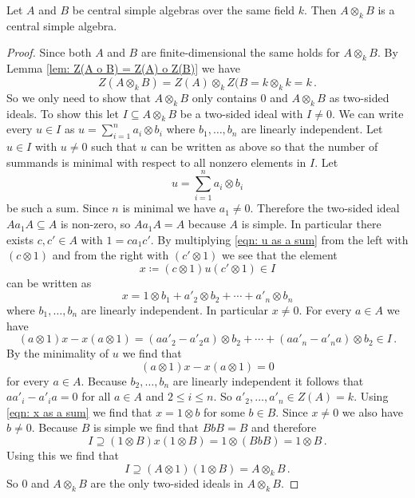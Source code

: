 \begin{prop}
  Let $A$ and $B$ be central simple algebras over the same field $k$.
  Then $A \otimes_k B$ is a central simple algebra.
\end{prop}
\begin{proof}
  Since both $A$ and $B$ are finite-dimensional the same holds for $A \otimes_k B$.
  By Lemma \ref{lem: Z(A o B) = Z(A) o Z(B)} we have
  \[
      Z(A \otimes_k B)
    = Z(A) \otimes_k Z(B
    = k \otimes_k k
    = k \,.
  \]
  So we only need to show that $A \otimes_k B$ only contains $0$ and $A \otimes_k B$ as two-sided ideals.
  To show this let $I \subseteq A \otimes_k B$ be a two-sided ideal with $I \neq 0$.
  We can write every $u \in I$ as $u = \sum_{i=1}^n a_i \otimes b_i$ where $b_1, \dotsc, b_n$ are linearly independent.
  Let $u \in I$ with $u \neq 0$ such that $u$ can be written as above so that the number of summands is minimal with respect to all nonzero elements in $I$.
  Let
  \begin{equation}\label{eqn: u as a sum}
    u = \sum_{i=1}^n a_i \otimes b_i
  \end{equation}
  be such a sum.
  Since $n$ is minimal we have $a_1 \neq 0$.
  Therefore the two-sided ideal $A a_1 A \subseteq A$ is non-zero, so $A a_1 A = A$ because $A$ is simple.
  In particular there exists $c, c' \in A$ with $1 = c a_1 c'$.
  By multiplying \eqref{eqn: u as a sum} from the left with $(c \otimes 1)$ and from the right with $(c' \otimes 1)$ we see that the element
  \[
              x
    \coloneqq (c \otimes 1) u (c' \otimes 1)
    \in       I
  \]
  can be written as
  \begin{equation}\label{eqn: x as a sum}
        x
    =   1 \otimes b_1
      + a'_2 \otimes b_2
      + \dotsb
      + a'_n \otimes b_n
  \end{equation}
  where $b_1, \dotsc, b_n$ are linearly independent.
  In particular $x \neq 0$.
  For every $a \in A$ we have
  \[
        (a \otimes 1) x - x (a \otimes 1)
    =   (a a'_2 - a'_2 a) \otimes b_2
      + \dotsb
      + (a a'_n - a'_n a) \otimes b_2 \in I \,.
  \]
  By the minimality of $u$ we find that
  \[
      (a \otimes 1) x - x (a \otimes 1)
    = 0
  \]
  for every $a \in A$.
  Because $b_2, \dotsc, b_n$ are linearly independent it follows that $a a'_i - a'_i a = 0$ for all $a \in A$ and $2 \leq i \leq n$.
  So $a'_2, \dotsc, a'_n \in Z(A) = k$.
  Using \eqref{eqn: x as a sum} we find that $x = 1 \otimes b$ for some $b \in B$.
  Since $x \neq 0$ we also have $b \neq 0$.
  Because $B$ is simple we find that $BbB = B$ and therefore
  \[
              I
    \supseteq (1 \otimes B) x (1 \otimes B)
    =         1 \otimes (BbB)
    =         1 \otimes B \,.
  \]
  Using this we find that
  \[
              I
    \supseteq (A \otimes 1) (1 \otimes B)
    =         A \otimes_k B \,.
  \]
  So $0$ and $A \otimes_k B$ are the only two-sided ideals in $A \otimes_k B$.
\end{proof}






